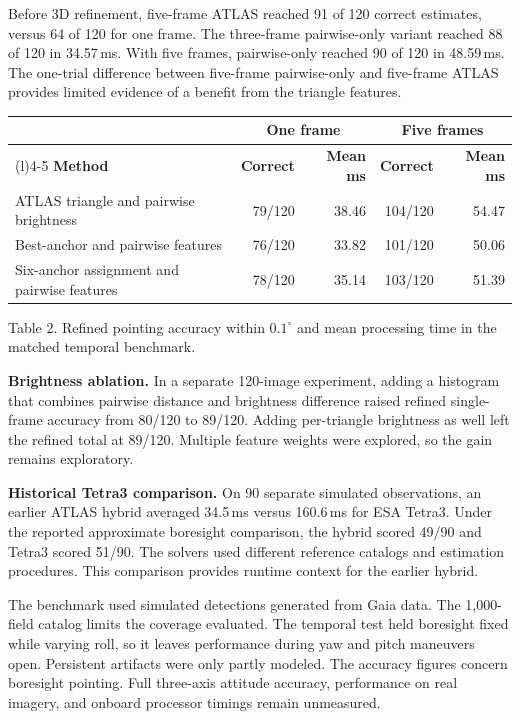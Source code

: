 \documentclass[11pt,letterpaper]{article}
\newcommand{\reportsection}[1]{\par\medskip{\large\sffamily\bfseries\color{accent}#1}\par\nobreak\smallskip}
\newcommand{\figurecaption}[1]{\par{\small\color{muted}#1}\par}
\begin{document}
Before 3D refinement, five-frame ATLAS reached 91 of 120 correct estimates,
versus 64 of 120 for one frame. The three-frame pairwise-only variant reached
88 of 120 in 34.57\,ms. With five frames, pairwise-only reached 90 of 120 in
48.59\,ms. The one-trial difference between five-frame pairwise-only and
five-frame ATLAS provides limited evidence of a benefit from the triangle features.

\newpage
\reportsection{5. Supporting benchmarks}
\smallskip
\begin{tabularx}{\linewidth}{@{}>{\raggedright\arraybackslash}Xrrrr@{}}
\toprule
& \multicolumn{2}{c}{\textbf{One frame}} & \multicolumn{2}{c}{\textbf{Five frames}} \\
\cmidrule(lr){2-3}\cmidrule(l){4-5}
\textbf{Method} & \textbf{Correct} & \textbf{Mean ms} & \textbf{Correct} & \textbf{Mean ms}\\
\midrule
ATLAS triangle and pairwise brightness & 79/120 & 38.46 & 104/120 & 54.47 \\
Best-anchor and pairwise features & 76/120 & 33.82 & 101/120 & 50.06 \\
Six-anchor assignment and pairwise features & 78/120 & 35.14 & 103/120 & 51.39 \\
\bottomrule
\end{tabularx}
\figurecaption{Table 2. Refined pointing accuracy within \(0.1^\circ\) and mean processing time in the matched temporal benchmark.}

\medskip
\textbf{Brightness ablation.}
In a separate 120-image experiment, adding a histogram that combines
pairwise distance and brightness difference raised refined single-frame
accuracy from 80/120 to 89/120. Adding per-triangle brightness as well
left the refined total at 89/120. Multiple feature weights were explored,
so the gain remains exploratory.

\textbf{Historical Tetra3 comparison.}
On 90 separate simulated observations, an earlier ATLAS hybrid averaged
34.5\,ms versus 160.6\,ms for ESA Tetra3. Under the reported approximate
boresight comparison, the hybrid scored 49/90 and Tetra3 scored 51/90.
The solvers used different reference catalogs and estimation procedures.
This comparison provides runtime context for the earlier hybrid.

\reportsection{6. Limitations}
The benchmark used simulated detections generated from Gaia data. The
1,000-field catalog limits the coverage evaluated. The temporal test held
boresight fixed while varying roll, so it leaves performance during
yaw and pitch maneuvers open. Persistent artifacts were only partly
modeled. The accuracy figures concern boresight pointing. Full three-axis
attitude accuracy, performance on real imagery, and onboard processor
timings remain unmeasured.
\end{document}
